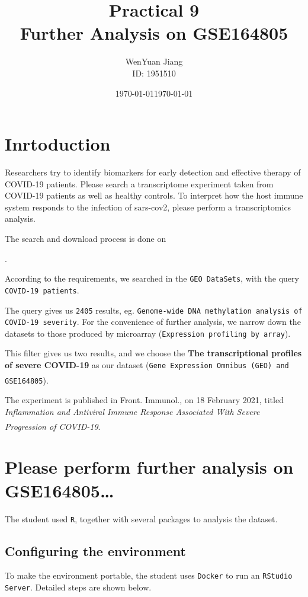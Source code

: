 \documentclass[en,black,12pt,normal]{elegantnote}
\title{Practical 9\\Further Analysis on GSE164805}
\author{WenYuan Jiang\\ID: 1951510}
\institute{School of Life Science, Tongji University}
\date{\today}
\newcommand{\upcite}[1]{\textsuperscript{\textsuperscript{\cite{#1}}}}
\begin{document}
\maketitle

\tableofcontents

\section{Inrtoduction}

Researchers try to identify biomarkers for early detection and effective therapy of COVID-19 patients. 
Please search a transcriptome experiment taken from COVID-19 patients as well as healthy controls. 
To interpret how the host immune system responds to the infection of sars-cov2, please perform a transcriptomics analysis.


The search and download process is done on \date{\today}.

According to the requirements, we searched in the \lstinline{GEO DataSets}, with the query \lstinline{COVID-19 patients}.

The query gives us \lstinline{2405} results, eg. \lstinline{Genome-wide DNA methylation analysis of COVID-19 severity}. 
For the convenience of further analysis, 
we narrow down the datasets to those produced by microarray (\lstinline{Expression profiling by array}).

This filter gives us two results, and we choose the \textbf{The transcriptional profiles of severe COVID-19}
as our dataset (\lstinline{Gene Expression Omnibus (GEO) and GSE164805}).\upcite{barrett2012ncbi}

The experiment is published in Front. Immunol., on 18 February 2021, 
titled \textit{Inflammation and Antiviral Immune Response Associated With Severe Progression of COVID-19}.\upcite{fimmu2021}



\section{Please perform further analysis on GSE164805\dots}

The student used \lstinline{R}, together with several packages to analysis the dataset.

\subsection{Configuring the environment}
To make the environment portable, the student uses \lstinline{Docker} to run an \lstinline{RStudio Server}. Detailed steps are shown below.
\end{document}
